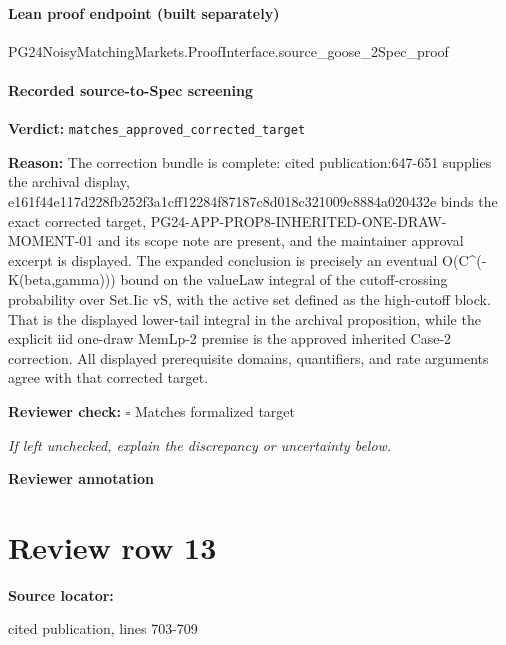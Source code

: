\documentclass[10pt]{article}
\newcommand{\reviewerbox}{%
  \par\noindent\fbox{\parbox{0.96\linewidth}{\rule{0pt}{0.38in}}}\par
}
\newcommand{\reviewmatch}[1]{%
  \par\noindent\textbf{Reviewer check:} $\square$\; #1\par
  \noindent\emph{If left unchecked, explain the discrepancy or uncertainty below.}\par
}
\begin{document}
\paragraph{Lean proof endpoint (built separately)}\begin{ReviewVerbatim}
PG24NoisyMatchingMarkets.ProofInterface.source_goose_2Spec_proof
\end{ReviewVerbatim}

\paragraph{Recorded source-to-Spec screening}
\textbf{Verdict:} \texttt{matches\_approved\_corrected\_target}
\\
{\raggedright
\textbf{Reason:} The correction bundle is complete:\allowbreak{} cited publication:\allowbreak{}647-\allowbreak{}651 supplies the archival display, e161f44e117d228fb252f3a1cff12284f87187c8d018c321009c8884a020432e binds the exact corrected target, PG24-\allowbreak{}APP-\allowbreak{}PROP8-\allowbreak{}INHERITED-\allowbreak{}ONE-\allowbreak{}DRAW-\allowbreak{}MOMENT-\allowbreak{}01 and its scope note are present, and the maintainer approval excerpt is displayed.\allowbreak{} The expanded conclusion is precisely an eventual O(C\textasciicircum{}(-\allowbreak{}K(beta,gamma))) bound on the valueLaw integral of the cutoff-\allowbreak{}crossing probability over Set.\allowbreak{}Iic vS, with the active set defined as the high-\allowbreak{}cutoff block.\allowbreak{} That is the displayed lower-\allowbreak{}tail integral in the archival proposition, while the explicit iid one-\allowbreak{}draw MemLp-\allowbreak{}2 premise is the approved inherited Case-\allowbreak{}2 correction.\allowbreak{} All displayed prerequisite domains, quantifiers, and rate arguments agree with that corrected target.\allowbreak{}
\par}
\reviewmatch{Matches formalized target}
\noindent\textbf{Reviewer annotation}\par
\reviewerbox
\clearpage
\hypertarget{source-claim-5395bd56b3a3fad8}{}
\section*{Review row 13}
\textbf{Source locator:} {\footnotesize\raggedright cited publication, lines 703-\allowbreak{}709\par}
\end{document}
